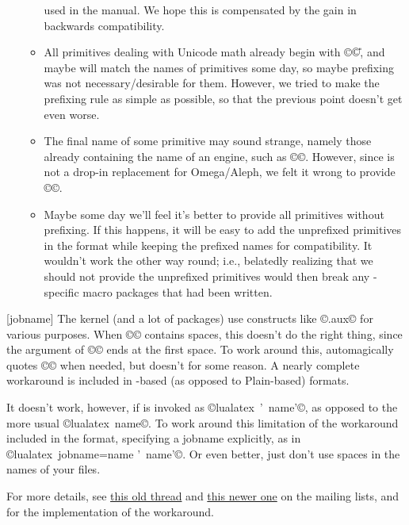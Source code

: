 \documentclass{lltxdoc}
\begin{document}
\begin{myquote}
\begin{enumerate}
\begin{itemize}
          used in the manual.  We hope this is compensated by the gain in
          backwards compatibility.
        \item All primitives dealing with Unicode math already begin with ©\U©,
          and maybe will match the names of \xetex primitives some day, so
          maybe prefixing was not necessary/desirable for them. However, we
          tried to make the prefixing rule as simple as possible, so that
          the previous point doesn't get even worse.
        \item The final name of some primitive may sound strange, namely those
          already containing the name of an engine, such as
          ©\luatexOmegaVersion©.  However, since \luatex is not a drop-in
          replacement for Omega/Aleph, we felt it wrong to provide
          ©\OmegaVersion©.
        \item Maybe some day we'll feel it's better to provide all primitives
          without prefixing. If this happens, it will be easy to add the
          unprefixed primitives in the format while keeping the prefixed names
          for compatibility. It wouldn't work the other way round; i.e.,
          belatedly realizing that we should not provide the unprefixed
          primitives would then break any \luatex-specific macro packages
          that had been written.
      \end{itemize}
  \end{enumerate}
\end{myquote}

[jobname]
The \latex kernel (and a lot of packages) use constructs like
©\jobname.aux© for various purposes. When ©\jobname© contains spaces,
this doesn't do the right thing, since the argument of ©© ends at the
first space. To work around this, \pdftex automagically quotes ©\jobname© when
needed, but \luatex doesn't for some reason. A nearly complete workaround is
included in \latex-based (as opposed to Plain-based) \luatex formats.

It doesn't work, however, if \luatex is invoked as ©lualatex ' name'©,
as opposed to the more usual ©lualatex name©. To work around this
limitation of the workaround included in the format, specifying a jobname
explicitly, as in ©lualatex jobname=name ' name'©. Or even better, just
don't use spaces in the names of your \tex files.

For more details, see
\href{http://www.ntg.nl/pipermail/dev-luatex/2009-April/002549.html}{this old
  thread} and
\href{http://tug.org/pipermail/luatex/2010-August/001986.html}{this newer one}
on the \luatex mailing lists, and  for the
implementation of the workaround.
\end{document}
